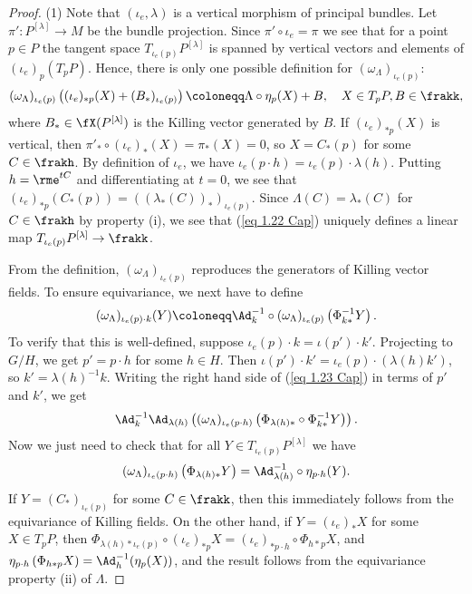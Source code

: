 \begin{proof}
    (1) Note that $(\iota_e,\lambda)$ is a vertical morphism of principal bundles. Let $\pi':P^{[\lambda]}\to M$ be the bundle projection. Since $\pi'\circ \iota_e=\pi$ we see that for a point $p\in P$ the tangent space $T_{\iota_e(p)}P^{[\lambda]}$ is spanned by vertical vectors and elements of $(\iota_e)_p(T_p P)$. Hence, there is only one possible definition for $(\omega_\Lambda)_{\iota_e(p)}$:
    \[(\omega_\Lambda)_{\iota_e(p)}\left((\iota_e)_{\ast p}(X)+(B_\ast)_{\iota_e(p)}\right)\coloneqq \Lambda\circ \eta_p (X)+B,\quad X\in T_p P,B\in\frakk,\label{eq 1.22 Cap}\]
    where $B_\ast\in\fX(P^{[\lambda]})$ is the Killing vector generated by $B$.  If $(\iota_e)_{\ast p}(X)$ is vertical, then $\pi'_\ast\circ (\iota_e)_\ast (X)=\pi_\ast(X)=0$, so $X=C_\ast(p)$ for some $C\in\frakh$. By definition of $\iota_e$, we have $\iota_e(p\cdot h)=\iota_e(p)\cdot \lambda(h)$. Putting $h=\rme^{tC}$ and differentiating at $t=0$, we see that $(\iota_e)_{\ast p}(C_\ast(p))=\left((\lambda_\ast(C))_\ast\right)_{\iota_e(p)}$. Since $\Lambda(C)=\lambda_\ast(C)$ for $C\in\frakh$ by property (i), we see that (\ref{eq 1.22 Cap}) uniquely defines a linear map $T_{\iota_e(p)}P^{[\lambda]}\to\frakk$.

    From the definition, $(\omega_\Lambda)_{\iota_e(p)}$ reproduces the generators of Killing vector fields. To ensure equivariance, we next have to define 
    \[(\omega_\Lambda)_{\iota_e(p)\cdot k}(Y)\coloneqq \Ad_k^{-1}\circ (\omega_\Lambda)_{\iota_e(p)}\left(\Phi_{k\ast}^{-1} Y\right).\label{eq 1.23 Cap}\]
    To verify that this is well-defined, suppose $\iota_e(p)\cdot k=\iota(p')\cdot k'$. Projecting to $G\slash H$, we get $p'=p\cdot h$ for some $h\in H$. Then $\iota(p')\cdot k'=\iota_e(p)\cdot(\lambda(h)k')$, so $k'=\lambda(h)^{-1}k$. Writing the right hand side of (\ref{eq 1.23 Cap}) in terms of $p'$ and $k'$, we get 
    \[\Ad_k^{-1}\Ad_{\lambda(h)}\left((\omega_\Lambda)_{\iota_e(p\cdot h)}\left(\Phi_{\lambda(h)\ast}\circ \Phi_{k\ast}^{-1}Y\right)\right).\] 
    Now we just need to check that for all $Y\in T_{\iota_e(p)}P^{[\lambda]}$ we have 
    \[(\omega_\Lambda)_{\iota_e(p\cdot h)}\left(\Phi_{\lambda(h)\ast}Y\right)=\Ad_{\lambda(h)}^{-1}\circ \eta_{p\cdot h}(Y).\]
    If $Y=(C_\ast)_{\iota_e(p)}$ for some $C\in\frakk$, then this immediately follows from the equivariance of Killing fields. On the other hand, if $Y=(\iota_e)_\ast X$ for some $X\in T_p P$, then $\Phi_{\lambda(h)\ast \iota_e(p)}\circ (\iota_e)_{\ast p}X=(\iota_e)_{\ast p\cdot h}\circ \Phi_{h\ast p}X$, and $\eta_{p\cdot h}\left(\Phi_{h\ast p}X\right)=\Ad_h^{-1}(\eta_p(X))$, and the result follows from the equivariance property (ii) of $\Lambda$.


\end{proof}
